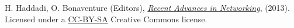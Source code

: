 
{\Huge \textbf{ }}


\vspace{7in}         H. Haddadi, O. Bonaventure (Editors), \href{\ebookurl}{\emph{Recent
         Advances in Networking}}, (2013). Licensed under a
         \href{http://creativecommons.org/licenses/by-sa/3.0/}{CC-BY-SA}
         Creative Commons license. 

